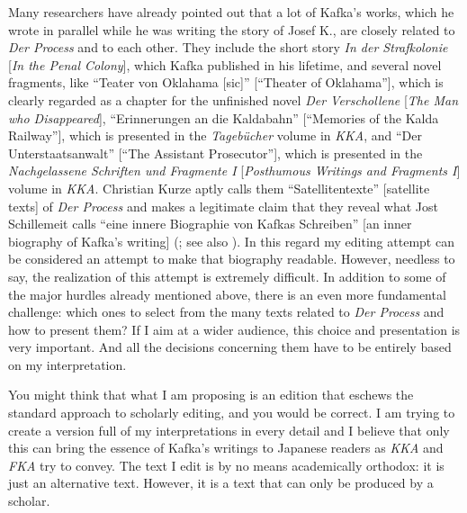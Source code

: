 \documentclass{article}
\begin{document}
Many researchers have already pointed out that a lot of Kafka's works,
which he wrote in parallel while he was writing the story of Josef K.,
are closely related to \emph{Der Process} and to each other. They
include the short story \emph{In der Strafkolonie} {[}\emph{In the Penal
Colony}{]}, which Kafka published in his lifetime, and several novel
fragments, like ``Teater von Oklahama [sic]'' {[}``Theater of
Oklahama''{]}, which is clearly regarded as a chapter for the unfinished novel
\emph{Der Verschollene} {[}\emph{The Man who Disappeared}{]},
``Erinnerungen an die Kaldabahn'' {[}``Memories of the Kalda
Railway''{]}, which is presented in the \emph{Tagebücher} volume in
\emph{KKA}, and ``Der Unterstaatsanwalt'' {[}``The Assistant
Prosecutor''{]}, which is presented in the \emph{Nachgelassene
Schriften und Fragmente I} {[}\emph{Posthumous Writings and Fragments
I}{]} volume in \emph{KKA}. Christian Kurze aptly calls them
``Satellitentexte'' {[}satellite texts{]} of \emph{Der Process} and
makes a legitimate claim that they reveal what Jost Schillemeit calls
``eine innere Biographie von Kafkas Schreiben'' {[}an inner biography
of Kafka's writing{]} (\cite{kurze_kafkas_2016}; see also \cite[224]{schillemeit_unterbrochene_2004}). In
this regard my editing attempt can be considered an attempt to make that
biography readable. However, needless to say, the realization of this
attempt is extremely difficult. In addition to some of the major hurdles
already mentioned above, there is an even more fundamental challenge:
which ones to select from the many texts related to \emph{Der Process}
and how to present them? If I aim at a wider audience, this
choice and presentation is very important. And all the decisions
concerning them have to be entirely based on my interpretation.

You might think that what I am proposing is an edition that eschews the
standard approach to scholarly editing, and you would be correct. I am
trying to create a version full of my interpretations in every detail and I believe that only this can bring the essence of Kafka's
writings to Japanese readers as \emph{KKA} and \emph{FKA} try to convey.
The text I edit is by no means academically orthodox: it is just an
alternative text. However, it is a text that can only be produced by a
scholar.
\end{document}
